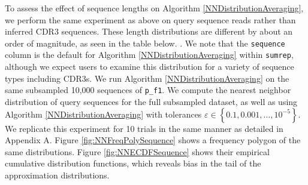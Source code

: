 \documentclass{article}
\begin{document}
To assess the effect of sequence lengths on Algorithm \ref{NNDistributionAveraging}, we perform the same experiment as above on query sequence reads rather than inferred CDR3 sequences.
These length distributions are different by about an order of magnitude, as seen in the table below.
.
We note that the \texttt{sequence} column is the default for Algorithm \ref{NNDistributionAveraging} within \texttt{sumrep}, although we expect users to examine this distribution for a variety of sequence types including CDR3s.
We run Algorithm \ref{NNDistributionAveraging} on the same subsampled 10,000 sequences of \texttt{p\_f1}.
We compute the nearest neighbor distribution of query sequences for the full subsampled dataset, as well as using Algorithm \ref{NNDistributionAveraging} with tolerances $\varepsilon \in \left\{0.1, 0.001, \dotsc, 10^{-5} \right\}$.
We replicate this experiment for 10 trials in the same manner as detailed in Appendix A.
Figure \ref{fig:NNFreqPolySequence} shows a frequency polygon of the same distributions.
Figure \ref{fig:NNECDFSequence} shows their empirical cumulative distribution functions, which reveals bias in the tail of the approximation distributions.
\end{document}
